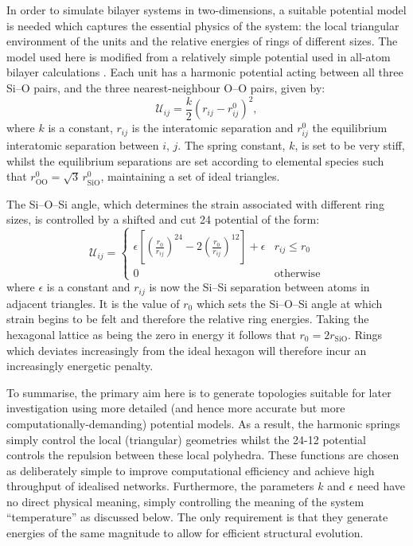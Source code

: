 In order to simulate bilayer systems in two\--dimensions, a suitable potential model is needed which captures the essential physics of the system: the local triangular environment of the \sioiii{} units and the relative energies of rings of different sizes. 
The model used here is modified from a relatively simple potential used in all\--atom bilayer calculations \cite{Wilson2013,Wilson2018}. 
Each \sioiii{} unit has a harmonic potential acting between all three Si\---O pairs, and the three nearest\--neighbour O\---O pairs, given by:
\begin{equation}
	\mathcal{U}_{ij} = \frac{k}{2}\left(r_{ij}-r_{ij}^{0}\right)^{2},
\end{equation}
where $k$ is a constant, $r_{ij}$ is the interatomic separation and $r_{ij}^{0}$ the equilibrium interatomic separation between $i$, $j$. 
The spring constant, $k$, is set to be very stiff, whilst the equilibrium separations are set according to elemental species such that $r_{\text{OO}}^{0}=\sqrt{3}\,r_{\text{SiO}}^{0}$, maintaining a set of ideal \sioiii{} triangles. 

The Si\---O\---Si angle, which determines the strain associated with different ring sizes, is controlled by a shifted and cut 24 potential of the form:
\begin{equation}
	\mathcal{U}_{ij} = 
	\begin{cases}
	\epsilon \left[ \left(\frac{r_{0}}{r_{ij}}\right)^{24}-2\left(\frac{r_{0}}{r_{ij}}\right)^{12} \right] + \epsilon & r_{ij}\leq r_{0} \\
	0 & \text{otherwise}
	\end{cases}
\end{equation}
where $\epsilon$ is a constant and $r_{ij}$ is now the Si\---Si separation between atoms in adjacent triangles. 
It is the value of $r_{0}$ which sets the Si\---O\---Si angle at which strain begins to be felt and therefore the relative ring energies.
Taking the hexagonal lattice as being the zero in energy it follows that $r_{0}=2r_{\text{SiO}}$.
Rings which deviates increasingly from the ideal hexagon will therefore incur an increasingly energetic penalty.

To summarise, the primary aim here is to generate topologies suitable for later investigation using more detailed (and hence more accurate but more
computationally-demanding) potential models. 
As a result, the harmonic springs simply control the local (triangular) geometries whilst the 24-12 potential controls the repulsion between these local polyhedra. 
These functions are chosen as deliberately simple to improve computational efficiency and achieve high throughput of idealised networks. 
Furthermore, the parameters $k$ and $\epsilon$ need have no direct physical meaning, simply controlling the
meaning of the system ``temperature'' as discussed below. 
The only requirement is that they generate energies of the same magnitude to allow for efficient
structural evolution.

